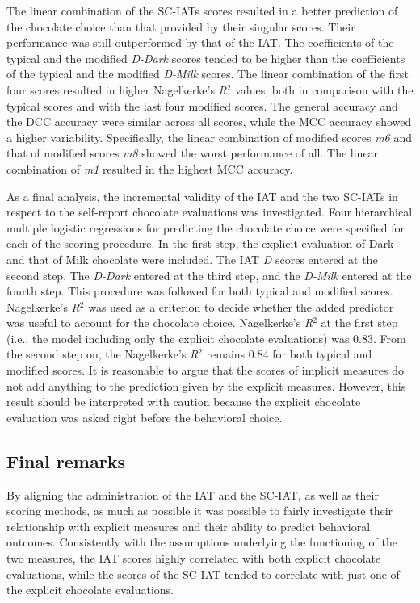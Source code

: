 \documentclass[12pt]{book}
\begin{document}
The linear combination of the SC-IATs scores resulted in a better prediction of the chocolate choice than that provided by their singular scores. Their performance was still outperformed by that of the IAT.
The coefficients of the typical and the modified \emph{D-Dark} scores tended to be higher than the coefficients of the typical and the modified \emph{D-Milk} scores. 
The linear combination of the first four scores resulted in higher Nagelkerke's \emph{R}$^2$ values, both in comparison with the typical scores and with the last four modified scores. 
The general accuracy and the DCC accuracy were similar across all scores, while the MCC accuracy showed a higher variability. Specifically, the linear combination of modified scores \emph{m6} and that of modified scores \emph{m8} showed the worst performance of all. The linear combination of \emph{m1} resulted in the highest MCC accuracy. 

As a final analysis, the incremental validity of the IAT and the two SC-IATs in respect to the self-report chocolate evaluations was investigated. 
Four hierarchical multiple logistic regressions for predicting the chocolate choice were specified for each of the scoring procedure. In the first step, the explicit evaluation of Dark and that of Milk chocolate were included. 
The IAT \emph{D} scores entered at the second step. The \emph{D-Dark} entered at the third step, and the \emph{D-Milk} entered at the fourth step. 
This procedure was followed for both typical and modified scores. Nagelkerke’s \emph{R}$^2$ was used as a criterion to decide whether the added predictor was useful to account for the chocolate choice. 
Nagelkerke’s \emph{R}$^2$ at the first step (i.e., the model including only the explicit chocolate evaluations) was 0.83. From the second step on, the Nagelkerke’s \emph{R}$^2$ remains $0.84$ for both typical and modified scores. 
It is reasonable to argue that the scores of implicit measures do not add anything to the prediction given by the explicit measures. However, this result should be interpreted with caution because the explicit chocolate evaluation was asked right before the behavioral choice.

\subsection{Final remarks}
By aligning the administration of the IAT and the SC-IAT, as well as their scoring methods, as much as possible it was possible to fairly investigate their relationship with explicit measures and their ability to predict behavioral outcomes.
Consistently with the assumptions underlying the functioning of the two measures, the IAT scores highly correlated with both explicit chocolate evaluations, while the scores of the SC-IAT tended to correlate with just one of the explicit chocolate evaluations.
\end{document}
